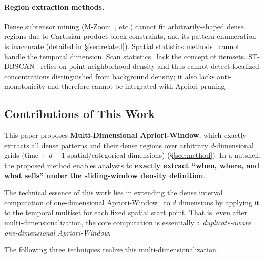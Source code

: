 \paragraph{Region extraction methods.}
Dense subtensor mining (M-Zoom~\cite{shin2018mzoom}, etc.)
cannot fit arbitrarily-shaped dense regions
due to Cartesian-product block constraints,
and its pattern enumeration is inaccurate
(detailed in \S\ref{sec:related}).
Spatial statistics methods~\cite{anselin1995lisa,ord1995getis}
cannot handle the temporal dimension.
Scan statistics~\cite{kulldorff1997spatial}
lack the concept of itemsets.
ST-DBSCAN~\cite{birant2007stdbscan} relies on
point-neighborhood density and thus cannot detect
localized concentrations distinguished from background density;
it also lacks anti-monotonicity and therefore
cannot be integrated with Apriori pruning.

\subsection{Contributions of This Work}

This paper proposes
\textbf{Multi-Dimensional Apriori-Window},
which exactly extracts all dense patterns and their dense regions
over arbitrary $d$-dimensional grids
(time + $d{-}1$ spatial/categorical dimensions)
(\S\ref{sec:method}).
In a nutshell, the proposed method enables analysts to
\textbf{exactly extract ``when, where, and what sells''
under the sliding-window density definition}.

The technical essence of this work lies in extending
the dense interval computation of
one-dimensional Apriori-Window~\cite{aprioriwindow}
to $d$ dimensions by applying it to
the temporal multiset for each fixed spatial start point.
That is, even after multi-dimensionalization,
the core computation is essentially
a \emph{duplicate-aware one-dimensional Apriori-Window}.

The following three techniques realize this multi-dimensionalization.

